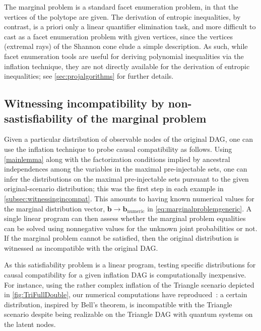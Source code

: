 {The marginal problem is a standard facet enumeration problem, in that the vertices of the polytope are given. The derivation of entropic inequalities, by contrast, is a priori only a linear quantifier elimination task, and more difficult to cast as a facet enumeration problem with given vertices, since the vertices (extremal rays) of the Shannon cone elude a simple description. As such, while facet enumeration tools are useful for deriving polynomial inequalities via the inflation technique, they are not directly available for the derivation of entropic inequalities; see \cref{sec:projalgorithms} for further details.

\subsection{Witnessing incompatibility by non-sastisfiability of the marginal problem}\label{sec:satisfiable}

Given a particular distribution of observable nodes of the original DAG, one can use the inflation technique to probe causal compatibility as follows. Using \cref{mainlemma} along with the factorization conditions implied by ancestral independences among the variables in the maximal pre-injectable sets, one can infer the distributions on the maximal pre-injectable sets pursuant to the given original-scenario distribution; this was the first step in each example in \cref{subsec:witnessingincompat}. This amounts to having known numerical values for %
the marginal distribution vector, $\bm{b}\to\bm{b}_{\mbox{numeric}}$ in \cref{eq:marginalproblemgeneric}. A single linear program can then assess whether the marginal problem equalities can be solved using nonnegative values for the unknown joint probabilities or not. If the marginal problem cannot be satisfied, then the original distribution is witnessed as incompatible with the original DAG. 

As this satisfiability problem is a linear program, testing specific distributions for causal compatibility for a given inflation DAG is computationally inexpensive. For instance, using the rather complex inflation of the Triangle scenario depicted in \cref{fig:TriFullDouble}, our numerical computations have reproduced~\cite[Theorem~2.16]{fritz2012bell}: a certain distribution, inspired by Bell's theorem, is incompatible with the Triangle scenario despite being realizable on the Triangle DAG with quantum systems on the latent nodes.

}
